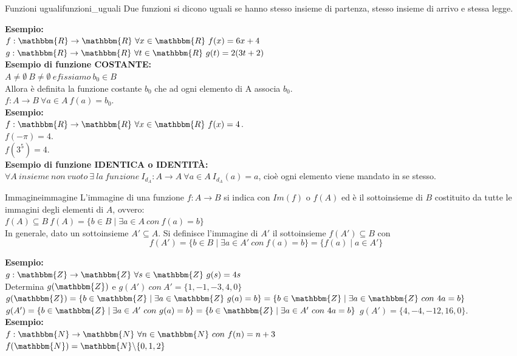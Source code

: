 \documentclass[12pt, letterpaper]{report}
\newcounter{definition}
\newcommand{\nmu}{}
\begin{document}
	\begin{definition}{\nmu Funzioni uguali}{funzioni_uguali}
		Due funzioni si dicono uguali se hanno stesso insieme di partenza, stesso insieme di arrivo e stessa legge.
	\end{definition}
	\textbf{Esempio: }
	\\
	$f: \mathbbm{R} \to \mathbbm{R} \ \forall x \in \mathbbm{R} \ f(x) = 6x + 4$
	\\
	$g: \mathbbm{R} \to \mathbbm{R} \ \forall t \in \mathbbm{R} \ g(t) = 2(3t + 2)$
	\\
	\textbf{Esempio di funzione COSTANTE: }
	\\
	$A \neq \emptyset \ B \neq \emptyset \ e fissiamo \ b_{0} \in B$
	\\
	Allora è definita la funzione costante $b_{0}$ che ad ogni elemento di A associa $b_{0}$.
	\\
	$f: A \to B \ \forall a \in A \ f(a) = b_{0}$.
	\\
	\textbf{Esempio: }
	\\
	$f: \mathbbm{R} \to \mathbbm{R} \ \forall x \in \mathbbm{R} \ f(x) = 4$.
	\\
	$f(-\pi) = 4$.
	\\
	$f(3^5) = 4$.
	\\
	\textbf{Esempio di funzione IDENTICA o IDENTITÀ: }
	\\
	$\forall A \ insieme \ non \ vuoto \ \exists \ la \ funzione \ I_{d_{A}}: A \to A \ \forall a \in A \ I_{d_{A}}(a) = a$, cioè ogni elemento viene mandato in se stesso.

	\begin{definition}{\nmu Immagine}{immagine}
		L'immagine di una funzione $f: A \to B$ si indica con $Im(f)$ o $f(A)$ ed è il sottoinsieme di $B$ costituito da tutte le immagini degli elementi di $A$, ovvero:
		\\
		$f(A) \subseteq B \ f(A) = \{b \in B \mid \exists a \in A \ con \ f(a) = b \}$
		\\
		In generale, dato un sottoinsieme $A' \subseteq A$. Si definisce l'immagine di $A'$ il sottoinsieme $f(A') \subseteq B$ con
		\[
		f(A') = \{b \in B \mid \exists a \in A' \ con \ f(a) = b\} = \{f(a) \mid a \in A'\}
		\]
	\end{definition}

	\textbf{Esempio: }
	\\
	$g: \mathbbm{Z} \to \mathbbm{Z} \ \forall s \in \mathbbm{Z} \ g(s) = 4s$
	\\
	Determina $g(\mathbbm{Z})$ e $g(A') \ con \ A' = \{1, -1, -3, 4, 0\}$
	\\
	$g(\mathbbm{Z}) = \{b \in \mathbbm{Z} \mid \exists a \in \mathbbm{Z} \ g(a) = b\} = \{b \in \mathbbm{Z} \mid \exists a \in \mathbbm{Z} \ con \ 4a = b\}$
	\\
	$g(A') = \{b \in \mathbbm{Z} \mid \exists a \in A' \ con \ g(a) = b\} = \{b \in \mathbbm{Z} \mid \exists a \in A' \ con \ 4a = b\}$
	$g(A') = \{4, -4, -12, 16, 0\}$.
	\\
	\textbf{Esempio: }
	\\
	$f: \mathbbm{N} \to \mathbbm{N} \ \forall n \in \mathbbm{N} \ con \ f(n) = n + 3$
	\\
	$f(\mathbbm{N}) = \mathbbm{N} \backslash \{0, 1, 2\}$
\end{document}
